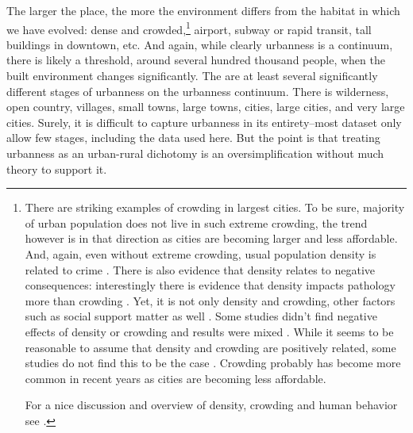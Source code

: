 \documentclass[10pt, letterpaper]{article}
\begin{document}
The larger the place, the more the %
environment differs from the habitat in
which we have evolved: dense and crowded,\footnote{There are striking examples of crowding in largest cities.  To
  be sure, majority of urban population does not live in such extreme crowding,
  the trend however is in that direction as cities are becoming larger and less
  affordable. And, again, even without extreme crowding, usual population
  density is related to crime \citep{bettencourt10b}. There is also evidence
  that density relates to negative consequences: interestingly there is evidence
  that density impacts pathology more than crowding
  \citep{levy1974effects}. Yet, it is not only density and crowding, other
  factors such as social support matter as well \citep{cassel2017health}. Some
  studies didn't find negative effects of density or crowding and results were
  mixed \citep{collette1976urban}. While it seems to be reasonable to assume
  that density and crowding are positively related, some studies do not find
  this to be the case \citep{webb1975meaning,rodgers1982density}
  .
Crowding probably has become more common in recent years as cities are becoming
less affordable. \citet{misraCL15oct6,floridaCL18apr11,weinbergCL16aug11,solariMISC19apr24,schuetzMISC19may7,kotkin_db_mar20_13}
  
  For a nice discussion and overview of density, crowding and human behavior see \citet{boots1979population,choldin1978urban}.}
airport, subway or rapid transit, tall buildings in downtown, etc. And
again, while clearly urbanness is a continuum, there is likely a threshold,  around
 several hundred thousand people, when the built environment changes
 significantly.
%
 The are at least several significantly different stages of urbanness on the
 urbanness continuum. There is
 wilderness, open country, villages, small towns, large towns, cities, large
 cities, and very large cities. Surely, it is difficult to capture urbanness in
 its entirety--most dataset only allow few stages, including the data used
 here. But the point is that treating urbanness as an urban-rural dichotomy \citep[][]{glaeser11,burger20} is an
 oversimplification without much theory to support it.
\end{document}

